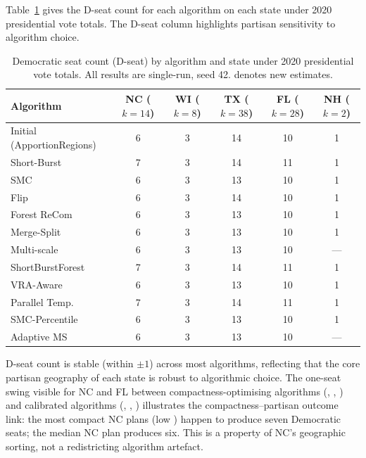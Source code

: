 Table~\ref{tab:dseat} gives the D-seat count for each algorithm on each state
under 2020 presidential vote totals.
The D-seat column highlights partisan sensitivity to algorithm choice.

\begin{table}[ht]
\centering
\caption{%
  Democratic seat count (D-seat) by algorithm and state under 2020 presidential
  vote totals.
  All results are single-run, seed 42.
  \dag{} denotes new estimates.
}
\label{tab:dseat}
\small
\begin{tabular}{@{}lccccc@{}}
\toprule
Algorithm & NC ($k=14$) & WI ($k=8$) & TX ($k=38$) & FL ($k=28$)\dag{} & NH ($k=2$)\dag{} \\
\midrule
Initial (ApportionRegions) & 6 & 3 & 14 & \dag{}10 & \dag{}1 \\
\midrule
Short-Burst     & 7 & 3 & 14 & \dag{}11 & \dag{}1 \\
SMC             & 6 & 3 & 13 & \dag{}10 & \dag{}1 \\
Flip            & 6 & 3 & 14 & \dag{}10 & \dag{}1 \\
Forest ReCom    & 6 & 3 & 13 & \dag{}10 & \dag{}1 \\
Merge-Split     & 6 & 3 & 13 & \dag{}10 & \dag{}1 \\
Multi-scale     & 6 & 3 & 13 & \dag{}10 & --- \\
ShortBurstForest & 7 & 3 & 14 & \dag{}11 & \dag{}1 \\
VRA-Aware       & 6 & 3 & 13 & \dag{}10 & \dag{}1 \\
\midrule
Parallel Temp.  & \dag{}7 & \dag{}3 & \dag{}14 & \dag{}11 & \dag{}1 \\
SMC-Percentile  & \dag{}6 & \dag{}3 & \dag{}13 & \dag{}10 & \dag{}1 \\
Adaptive MS     & \dag{}6 & \dag{}3 & \dag{}13 & \dag{}10 & --- \\
\bottomrule
\end{tabular}
\end{table}

D-seat count is stable (within $\pm 1$) across most algorithms, reflecting
that the core partisan geography of each state is robust to algorithmic
choice.
The one-seat swing visible for NC and FL between compactness-optimising
algorithms (\sburst{}, \sburstf{}, \pt{}) and calibrated algorithms (\smc{},
\msp{}, \ms{}) illustrates the compactness--partisan outcome link:
the most compact NC plans (low \ec{}) happen to produce seven Democratic
seats; the median NC plan produces six.
This is a property of NC's geographic sorting, not a redistricting algorithm
artefact.


